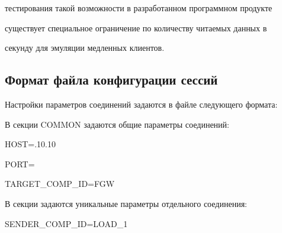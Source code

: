 тестирования такой возможности в разработанном программном продукте


существует специальное ограничение по количеству читаемых данных в


секунду для эмуляции медленных клиентов.





\vspace*{-6pt}





  \subsection{Формат файла конфигурации сессий}





  Настройки параметров соединений задаются в файле следующего формата:





  В секции {\sf COMMON} задаются общие параметры соединений:





  \noindent


{\sf   [COMMON]}





  \noindent


{\sf   HOST\;=.10.10}





  \noindent


{\sf   PORT\;=}





  \noindent


{\sf   TARGET\_COMP\_ID\;=\;FGW}





  В секции {\sf [FIX]} задаются уникальные параметры отдельного соединения:





  \noindent


{\sf   [FIX]}





  \noindent


{\sf   SENDER\_COMP\_ID\;=\;LOAD\_1}





